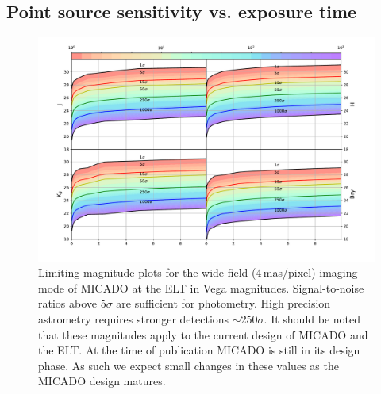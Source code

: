 \subsection{Point source sensitivity vs. exposure time}
\label{subsec:MICADO_sensitivities}

\begin{figure}

    \centering
    \includegraphics[width=\textwidth]{images/MICADO_SNR_Rainbow_JHKBrG_ab}

    \caption{Limiting magnitude plots for the wide field (4\,mas/pixel) imaging mode of MICADO at the ELT in Vega magnitudes. Signal-to-noise ratios above $5\sigma$ are sufficient for photometry. High precision astrometry requires stronger detections $\sim 250\sigma$. It should be noted that these magnitudes apply to the current design of MICADO and the ELT. At the time of publication MICADO is still in its design phase. As such we expect small changes in these values as the MICADO design matures.}
    
    \label{fig:point_source_sensitivities}
    
\end{figure}






